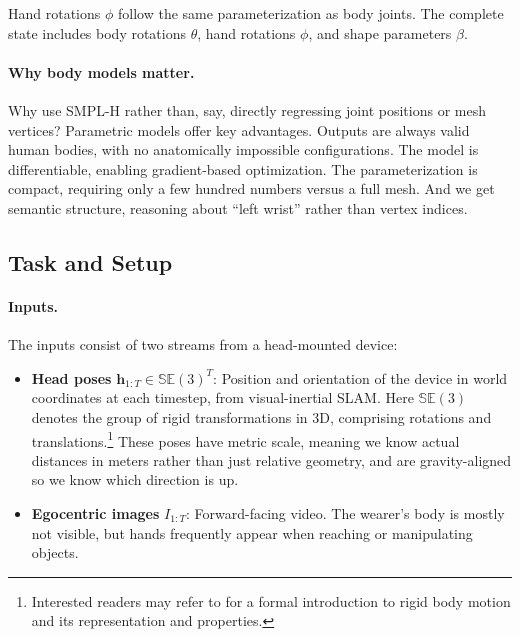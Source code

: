Hand rotations $\phi$ follow the same parameterization as body
joints. The complete state includes body rotations $\theta$, hand
rotations $\phi$, and shape parameters $\beta$.

\paragraph{Why body models matter.}
Why use SMPL-H rather than, say, directly regressing joint positions
or mesh vertices? Parametric models offer key advantages. Outputs are
always valid human bodies, with no anatomically impossible
configurations. The model is differentiable, enabling gradient-based
optimization. The parameterization is compact, requiring only a few
hundred numbers versus a full mesh. And we get semantic structure,
reasoning about ``left wrist'' rather than vertex indices.

\subsection{Task and Setup}
\label{sub:egoallo_objective}

\paragraph{Inputs.}
The inputs consist of two streams from a head-mounted device:
\begin{itemize}
    \item \textbf{Head poses} $\boldsymbol{h}_{1:T} \in \mathbb{SE}(3)^T$:
        Position and orientation of the device in world coordinates
        at each timestep, from visual-inertial SLAM. Here $\mathbb{SE}(3)$
        denotes the group of rigid transformations in 3D, comprising
        rotations and translations.\footnote{Interested readers may
            refer to \cite{MaY2003} for a formal introduction to rigid
        body motion and its representation and properties.} These
        poses have metric scale, meaning we know actual distances in
        meters rather than just relative geometry, and are
        gravity-aligned so we know which direction is up.
    \item \textbf{Egocentric images} $I_{1:T}$: Forward-facing video.
        The wearer's body is mostly not visible, but hands frequently
        appear when reaching or manipulating objects.
\end{itemize}

